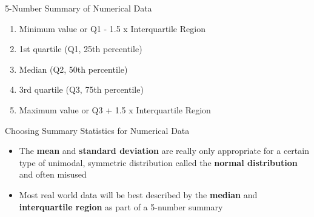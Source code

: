 \documentclass[
  ignorenonframetext,
]{beamer}
\begin{document}
\begin{frame}{5-Number Summary of Numerical Data}
\label{number-summary-of-numerical-data}
\begin{enumerate}
\item
  Minimum value or Q1 - 1.5 x Interquartile Region
\item
  1st quartile (Q1, 25th percentile)
\item
  Median (Q2, 50th percentile)
\item
  3rd quartile (Q3, 75th percentile)
\item
  Maximum value or Q3 + 1.5 x Interquartile Region
\end{enumerate}
\end{frame}

\begin{frame}{Choosing Summary Statistics for Numerical Data}
\label{choosing-summary-statistics-for-numerical-data}
\begin{itemize}
\item
  The \textbf{mean} and \textbf{standard deviation} are really only
  appropriate for a certain type of unimodal, symmetric distribution
  called the \textbf{normal distribution} and often misused
\item
  Most real world data will be best described by the \textbf{median} and
  \textbf{interquartile region} as part of a 5-number summary
\end{itemize}
\end{frame}
\end{document}

